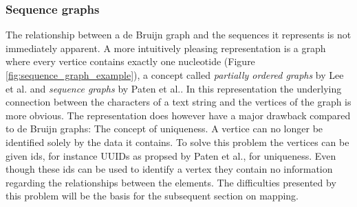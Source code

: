 \documentclass[thesis.tex]{subfiles}
\begin{document}
\subsubsection{Sequence graphs}
\label{sec:sequence_graphs}
The relationship between a de Bruijn graph and the sequences it represents is not immediately apparent. A more intuitively pleasing representation is a graph where every vertice contains exactly one nucleotide (Figure \ref{fig:sequence_graph_example}), a concept called \textit{partially ordered graphs} by Lee et al.\cite{improved_genome_inference_in_the_mhc_using_a_population_reference_graph} and \textit{sequence graphs} by Paten et al.\cite{mapping_to_a_reference_genome_structure}. In this representation the underlying connection between the characters of a text string and the vertices of the graph is more obvious. The representation does however have a major drawback compared to de Bruijn graphs: The concept of uniqueness. A vertice can no longer be identified solely by the data it contains. To solve this problem the vertices can be given ids, for instance UUIDs as propsed by Paten et al., for uniqueness. Even though these ids can be used to identify a vertex they contain no information regarding the relationships between the elements. The difficulties presented by this problem will be the basis for the subsequent section on mapping. 
\end{document}
